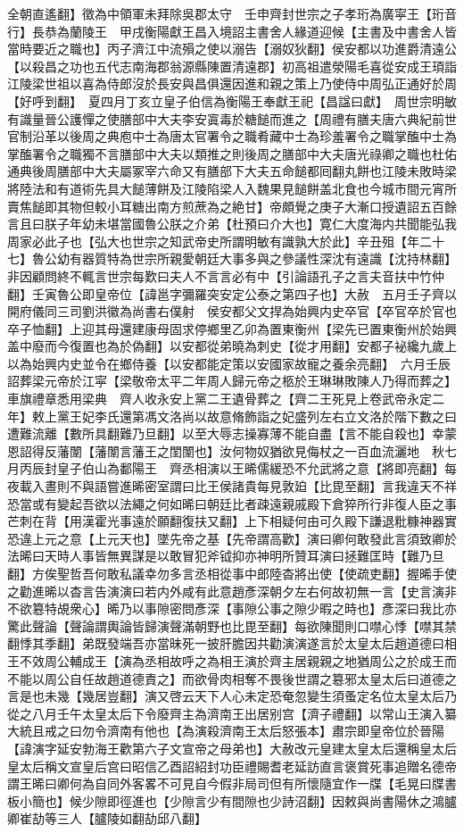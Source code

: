 全朝直遙翻】徵為中領軍未拜除吳郡太守　壬申齊封世宗之子孝珩為廣寜王【珩音行】長恭為蘭陵王　甲戌衡陽獻王昌入境詔主書舍人緣道迎候【主書及中書舍人皆當時要近之職也】丙子濟江中流殞之使以溺告【溺奴狄翻】侯安都以功進爵清遠公【以殺昌之功也五代志南海郡翁源縣陳置清遠郡】初高祖遣滎陽毛喜從安成王頊詣江陵梁世祖以喜為侍郎沒於長安與昌俱還因進和親之策上乃使侍中周弘正通好於周【好呼到翻】　夏四月丁亥立皇子伯信為衡陽王奉獻王祀【昌諡曰獻】　周世宗明敏有識量晉公護憚之使膳部中大夫李安寘毒於糖䭔而進之【周禮有膳夫唐六典紀前世官制沿革以後周之典庖中士為唐太官署令之職肴藏中士為珍羞署令之職掌醢中士為掌醢署令之職獨不言膳部中大夫以類推之則後周之膳部中大夫唐光祿卿之職也杜佑通典後周膳部中大夫屬冢宰六命又有膳部下大夫五命䭔都囘翻丸餅也江陵未敗時梁將陸法和有道術先具大䭔薄餅及江陵陷梁人入魏果見䭔餅盖北食也今城市間元宵所賣焦䭔即其物但較小耳糖出南方煎蔗為之絶甘】帝頗覺之庚子大漸口授遺詔五百餘言且曰朕子年幼未堪當國魯公朕之介弟【杜預曰介大也】寛仁大度海内共聞能弘我周家必此子也【弘大也世宗之知武帝史所謂明敏有識孰大於此】辛丑殂【年二十七】魯公幼有器質特為世宗所親愛朝廷大事多與之參議性深沈有遠識【沈持林翻】非因顧問終不輒言世宗每歎曰夫人不言言必有中【引論語孔子之言夫音扶中竹仲翻】壬寅魯公即皇帝位【諱邕字彌羅突安定公泰之第四子也】大赦　五月壬子齊以開府儀同三司劉洪徽為尚書右僕射　侯安都父文捍為始興内史卒官【卒官卒於官也卒子恤翻】上迎其母還建康母固求停鄉里乙卯為置東衡州【梁先已置東衡州於始興盖中廢而今復置也為於偽翻】以安都從弟曉為刺史【從才用翻】安都子袐纔九歲上以為始興内史並令在鄉侍養【以安都能定策以安國家故寵之養余亮翻】　六月壬辰詔葬梁元帝於江寜【梁敬帝太平二年周人歸元帝之柩於王琳琳敗陳人乃得而葬之】車旗禮章悉用梁典　齊人收永安上黨二王遺骨葬之【齊二王死見上卷武帝永定二年】敕上黨王妃李氏還第馮文洛尚以故意脩飾詣之妃盛列左右立文洛於階下數之曰遭難流離【數所具翻難乃旦翻】以至大辱志操寡薄不能自盡【言不能自殺也】幸蒙恩詔得反藩闈【藩闈言藩王之閨闈也】汝何物奴猶欲見侮杖之一百血流灑地　秋七月丙辰封皇子伯山為鄱陽王　齊丞相演以王晞儒緩恐不允武將之意【將即亮翻】每夜載入晝則不與語嘗進晞密室謂曰比王侯諸貴每見敦廹【比毘至翻】言我違天不祥恐當或有變起吾欲以法繩之何如晞曰朝廷比者疎遠親戚殿下倉猝所行非復人臣之事芒刺在背【用漢霍光事遠於願翻復扶又翻】上下相疑何由可久殿下謙退粃糠神器實恐違上元之意【上元天也】墜先帝之基【先帝謂高歡】演曰卿何敢發此言須致卿於法晞曰天時人事皆無異謀是以敢冒犯斧钺抑亦神明所贊耳演曰拯難匡時【難乃旦翻】方俟聖哲吾何敢私議幸勿多言丞相從事中郎陸杳將出使【使疏吏翻】握晞手使之勸進晞以杳言告演演曰若内外咸有此意趙彥深朝夕左右何故初無一言【史言演非不欲簒特覘衆心】晞乃以事隙密問彥深【事隙公事之隙少暇之時也】彥深曰我比亦驚此聲論【聲論謂輿論皆歸演聲滿朝野也比毘至翻】每欲陳聞則口噤心悸【噤其禁翻悸其季翻】弟既發端吾亦當昧死一披肝膽因共勸演演遂言於太皇太后趙道德曰相王不效周公輔成王【演為丞相故呼之為相王演於齊主居親親之地猶周公之於成王而不能以周公自任故趙道德責之】而欲骨肉相奪不畏後世謂之簒邪太皇太后曰道德之言是也未幾【幾居豈翻】演又啓云天下人心未定恐奄忽變生須蚤定名位太皇太后乃從之八月壬午太皇太后下令廢齊主為濟南王出居别宫【濟子禮翻】以常山王演入纂大統且戒之曰勿令濟南有他也【為演殺濟南王太后怒張本】肅宗即皇帝位於晉陽【諱演字延安勃海王歡第六子文宣帝之母弟也】大赦改元皇建太皇太后還稱皇太后皇太后稱文宣皇后宫曰昭信乙酉詔紹封功臣禮賜耆老延訪直言褒賞死事追贈名德帝謂王晞曰卿何為自同外客畧不可見自今假非局司但有所懷隨宜作一牒【毛晃曰牒書板小簡也】候少隙即徑進也【少隙言少有間隙也少詩沼翻】因敕與尚書陽休之鴻臚卿崔劼等三人【臚陵如翻劼邱八翻】